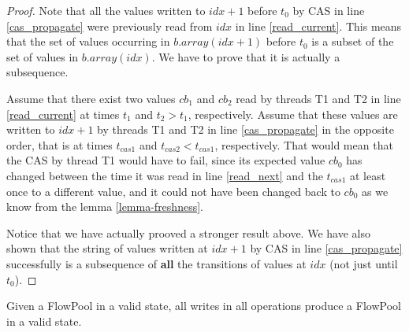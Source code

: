 \documentclass[runningheads,a4paper]{llncs}
\begin{document}
\begin{proof}
Note that all the values written to $idx + 1$ before $t_0$ by CAS in line \ref{cas_propagate} were
previously read from $idx$ in line \ref{read_current}.
This means that the set of values occurring in $b.array(idx + 1)$
before $t_0$ is a subset of the set of values in $b.array(idx)$.
We have to prove that it is actually a subsequence.

Assume that there exist two values $cb_1$ and $cb_2$ read by threads T1 and T2
in line \ref{read_current} at times $t_1$ and $t_2 > t_1$, respectively.
Assume that these values are written to $idx + 1$ by threads T1 and T2
in line \ref{cas_propagate} in the opposite order, that is at times
$t_{cas1}$ and $t_{cas2} < t_{cas1}$, respectively.
That would mean that the CAS by thread T1 would have to fail, since its expected
value $cb_0$ has changed between the time it was read in line \ref{read_next} and
the $t_{cas1}$ at least once to a different value, and it could not have been
changed back to $cb_0$ as we know from the lemma
\ref{lemma-freshness}.

Notice that we have actually prooved a stronger result above.
We have also shown that the string of values
written at $idx + 1$ by CAS in line \ref{cas_propagate} successfully is a subsequence
of \textbf{all} the transitions of values at $idx$ (not just until $t_0$).
\end{proof}


\begin{lemma}\label{lemma-valid}
Given a FlowPool in a valid state, all writes in all operations produce a FlowPool in a valid state.
\end{lemma}
\end{document}
